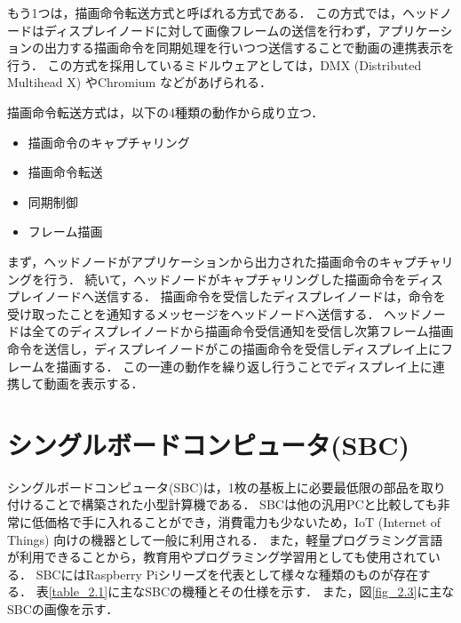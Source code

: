 もう1つは，描画命令転送方式と呼ばれる方式である．
この方式では，ヘッドノードはディスプレイノードに対して画像フレームの送信を行わず，アプリケーションの出力する描画命令を同期処理を行いつつ送信することで動画の連携表示を行う．
この方式を採用しているミドルウェアとしては，DMX (Distributed Multihead X) やChromium \cite{chromium}などがあげられる．

描画命令転送方式は，以下の4種類の動作から成り立つ．

\begin{itemize}
    \item 描画命令のキャプチャリング
    \item 描画命令転送
    \item 同期制御
    \item フレーム描画
\end{itemize}

  まず，ヘッドノードがアプリケーションから出力された描画命令のキャプチャリングを行う．
  続いて，ヘッドノードがキャプチャリングした描画命令をディスプレイノードへ送信する．
  描画命令を受信したディスプレイノードは，命令を受け取ったことを通知するメッセージをヘッドノードへ送信する．
  ヘッドノードは全てのディスプレイノードから描画命令受信通知を受信し次第フレーム描画命令を送信し，ディスプレイノードがこの描画命令を受信しディスプレイ上にフレームを描画する．
  この一連の動作を繰り返し行うことでディスプレイ上に連携して動画を表示する．

\section{シングルボードコンピュータ(SBC)}

シングルボードコンピュータ(SBC)は，1枚の基板上に必要最低限の部品を取り付けることで構築された小型計算機である．
SBCは他の汎用PCと比較しても非常に低価格で手に入れることができ，消費電力も少ないため，IoT (Internet of Things) 向けの機器として一般に利用される\cite{130007722836,7380571}．
また，軽量プログラミング言語が利用できることから，教育用やプログラミング学習用としても使用されている．
SBCにはRaspberry Piシリーズを代表として様々な種類のものが存在する．
表\ref{table_2.1}に主なSBCの機種とその仕様を示す．
また，図\ref{fig_2.3}に主なSBCの画像を示す．

